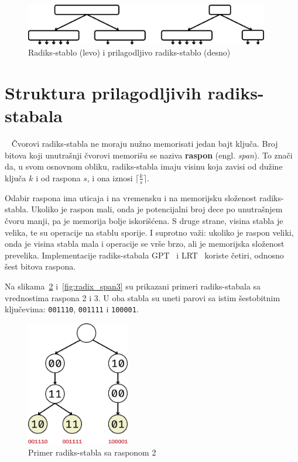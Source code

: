 \documentclass[12pt,oneside]{memoir}
\begin{document}
\hspace{10pt}
\begin{figure}[!h]
  \centering
  \includegraphics[width=0.95\textwidth]{radix_v_art.eps}
  \caption{
    Radiks-stablo (levo) i prilagodljivo radiks-stablo (desno)
  }
  \label{fig:radix_v_art}
\end{figure}

\section{Struktura prilagodljivih radiks-stabala}~\label{sec:struktura_art}
Čvorovi radiks-stabla ne moraju nužno memorisati jedan bajt ključa.
Broj bitova koji unutrašnji čvorovi memorišu se naziva \textbf{raspon} (engl. \emph{span}).
To znači da, u svom osnovnom obliku, radiks-stabla imaju visinu koja zavisi od
dužine ključa $k$ i od raspona $s$, i ona iznosi $ \lceil \frac{k}{s} \rceil $.

Odabir raspona ima uticaja i na vremensku i na memorijsku složenost
radiks-stabla. Ukoliko je raspon mali, onda je potencijalni broj dece po
unutrašnjem čvoru manji, pa je memorija bolje iskorišćena. S druge strane,
visina stabla je velika, te su operacije na stablu sporije.
I suprotno važi: ukoliko je raspon veliki,
onda je visina stabla mala i operacije se vrše brzo, ali je memorijska složenost
prevelika. Implementacije radiks-stabala GPT~\cite{gpt} i LRT~\cite{lrt}
koriste četiri, odnosno šest bitova raspona.

Na slikama~\ref{fig:radix_span2}
i~\ref{fig:radix_span3} su prikazani primeri radiks-stabala sa vrednostima
raspona 2 i 3. U oba stabla su uneti parovi sa istim šestobitnim ključevima:
\texttt{001110}, \texttt{001111} i \texttt{100001}.


\begin{figure}[!h]
  \centering
  \includegraphics[width=0.40\textwidth]{radix_span2.eps}
  \caption{Primer radiks-stabla sa rasponom 2}
  \label{fig:radix_span2}
\end{figure}
\end{document}
